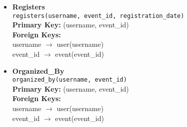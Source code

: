 \begin{itemize}
    \item \textbf{Registers} \\
        \texttt{registers(username, event\_id, registration\_date)} \\
        \textbf{Primary Key:} (username, event\_id) \\
        \textbf{Foreign Keys:} \\
        \hspace*{1cm} username $\rightarrow$ user(username) \\
        \hspace*{1cm} event\_id $\rightarrow$ event(event\_id)
        
    \item \textbf{Organized\_By} \\
        \texttt{organized\_by(username, event\_id)} \\
        \textbf{Primary Key:} (username, event\_id) \\
        \textbf{Foreign Keys:} \\
        \hspace*{1cm} username $\rightarrow$ user(username) \\
        \hspace*{1cm} event\_id $\rightarrow$ event(event\_id)
\end{itemize}

\clearpage






